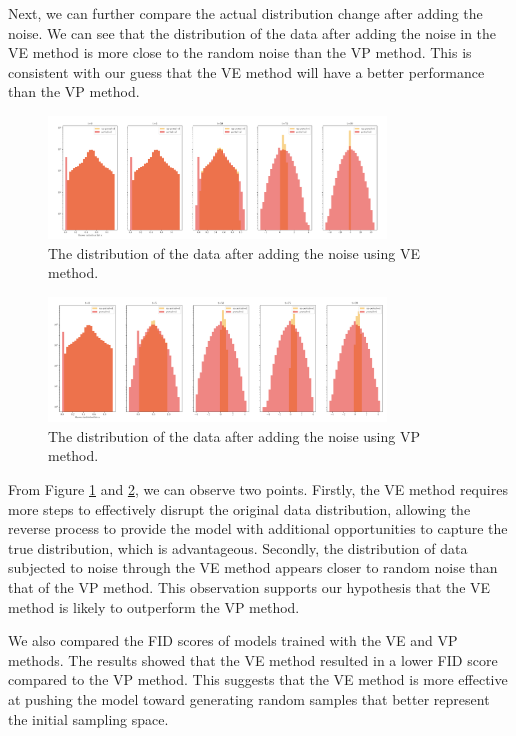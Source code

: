 Next, we can further compare the actual distribution change after adding the noise. We can see that the distribution of the data after adding the noise in the VE method is more close to the random noise than the VP method. This is consistent with our guess that the VE method will have a better performance than the VP method.

\begin{figure}[h!]
    \centering
    \includegraphics[width=0.8\textwidth]{Figures/VE_5_0.0001.png}
    \caption{The distribution of the data after adding the noise using VE method.}\label{fig:ve}
\end{figure}

\begin{figure}[h!]
    \centering
    \includegraphics[width=0.8\textwidth]{Figures/VP_5_0.0001.png}
    \caption{The distribution of the data after adding the noise using VP method.} \label{fig:vp}
\end{figure}

From Figure \ref{fig:ve} and \ref{fig:vp}, we can observe two points. Firstly, the VE method requires more steps to effectively disrupt the original data distribution, allowing the reverse process to provide the model with additional opportunities to capture the true distribution, which is advantageous. Secondly, the distribution of data subjected to noise through the VE method appears closer to random noise than that of the VP method. This observation supports our hypothesis that the VE method is likely to outperform the VP method. 

We also compared the FID scores of models trained with the VE and VP methods. The results showed that the VE method resulted in a lower FID score compared to the VP method. This suggests that the VE method is more effective at pushing the model toward generating random samples that better represent the initial sampling space.

